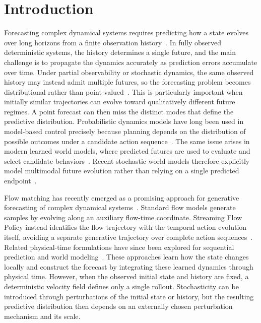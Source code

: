 \section{Introduction}

Forecasting complex dynamical systems requires predicting how a state evolves over long horizons from a finite observation history~\citep{zhang2025zero}. In fully observed deterministic systems, the history determines a single future, and the main challenge is to propagate the dynamics accurately as prediction errors accumulate over time. Under partial observability or stochastic dynamics, the same observed history may instead admit multiple futures, so the forecasting problem becomes distributional rather than point-valued~\citep{pfister2026stocbench}. This is particularly important when initially similar trajectories can evolve toward qualitatively different future regimes. A point forecast can then miss the distinct modes that define the predictive distribution. Probabilistic dynamics models have long been used in model-based control precisely because planning depends on the distribution of possible outcomes under a candidate action sequence~\citep{chua2018deep}. The same issue arises in modern learned world models, where predicted futures are used to evaluate and select candidate behaviors~\citep{zhou2025dinowm,maes2026leworldmodel}. Recent stochastic world models therefore explicitly model multimodal future evolution rather than relying on a single predicted endpoint~\citep{porcher2026flow}.

Flow matching has recently emerged as a promising approach for generative forecasting of complex dynamical systems~\citep{lim2026flow,porcher2026flow}. Standard flow models generate samples by evolving along an auxiliary flow-time coordinate. Streaming Flow Policy instead identifies the flow trajectory with the temporal action evolution itself, avoiding a separate generative trajectory over complete action sequences~\citep{jiang2025streaming}. Related physical-time formulations have since been explored for sequential prediction and world modeling~\citep{lim2026flow,liu2026odeworld}. These approaches learn how the state changes locally and construct the forecast by integrating these learned dynamics through physical time. However, when the observed initial state and history are fixed, a deterministic velocity field defines only a single rollout. Stochasticity can be introduced through perturbations of the initial state or history, but the resulting predictive distribution then depends on an externally chosen perturbation mechanism and its scale.

